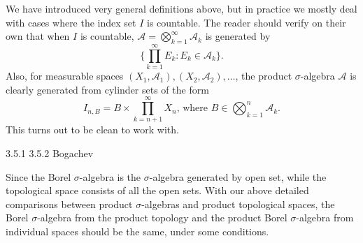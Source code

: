 \documentclass[10pt]{book}
\numberwithin{equation}{chapter}
\theoremstyle{plain-star}
\theoremstyle{definition-star}
\theoremstyle{remark-star}
\theoremstyle{plain-star}
\newcommand{\A}{\mathcal{A}}
\begin{document}
We have introduced very general definitions above, but in practice we mostly deal with cases where the index set $I$ is countable. The reader should verify on their own that when $I$ is countable, $\A = \bigotimes_{k=1}^\infty \A_k$ is generated by \[
    \biggl\{\prod_{k=1}^\infty E_k :E_k \in \A_k \biggr\}.
\] Also, for measurable spaces $(X_1,\A_1),(X_2,\A_2),\dotsc$, the product $\sigma$-algebra $\A$ is clearly generated from cylinder sets of the form \[
    I_{n,B} = B \times \prod_{k= n+ 1}^\infty X_n\text{, where }B \in \bigotimes_{k=1}^n \A_k.
\] This turns out to be clean to work with.


3.5.1 3.5.2 Bogachev

Since the Borel $\sigma$-algebra is the $\sigma$-algebra generated by open set, while the topological space consists of all the open sets. With our above detailed comparisons between product $\sigma$-algebras and product topological spaces, the Borel $\sigma$-algebra from the product topology and the product Borel $\sigma$-algebra from individual spaces should be the same, under some conditions.
\end{document}
